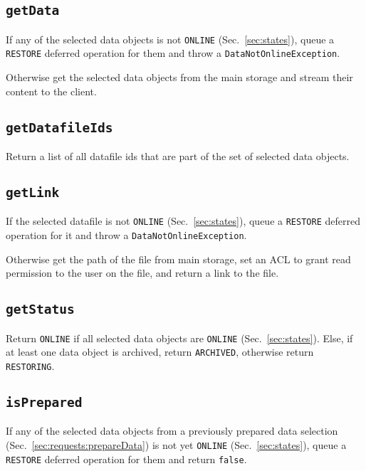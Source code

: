 \documentclass[paper=a4]{scrartcl}
\begin{document}
\subsection{\texttt{getData}}
\label{sec:requests:getdata}

If any of the selected data objects is not \texttt{ONLINE}
(Sec.\ \ref{sec:states}), queue a \texttt{RESTORE} deferred operation
for them and throw a \texttt{DataNotOnlineException}.

Otherwise get the selected data objects from the main storage and
stream their content to the client.

\subsection{\texttt{getDatafileIds}}

Return a list of all datafile ids that are part of the set of
selected data objects.

\subsection{\texttt{getLink}}
\label{sec:requests:getlink}

If the selected datafile is not \texttt{ONLINE}
(Sec.\ \ref{sec:states}), queue a \texttt{RESTORE} deferred operation
for it and throw a \texttt{DataNotOnlineException}.

Otherwise get the path of the file from main storage, set an ACL to
grant read permission to the user on the file, and return a link to
the file.

\subsection{\texttt{getStatus}}

Return \texttt{ONLINE} if all selected data objects are
\texttt{ONLINE} (Sec.\ \ref{sec:states}). Else, if at least one data
object is archived, return \texttt{ARCHIVED}, otherwise return
\texttt{RESTORING}.

\subsection{\texttt{isPrepared}}

If any of the selected data objects from a previously prepared
data selection (Sec.\ \ref{sec:requests:prepareData}) is not yet
\texttt{ONLINE} (Sec.\ \ref{sec:states}), queue a \texttt{RESTORE}
deferred operation for them and return \texttt{false}.
\end{document}
